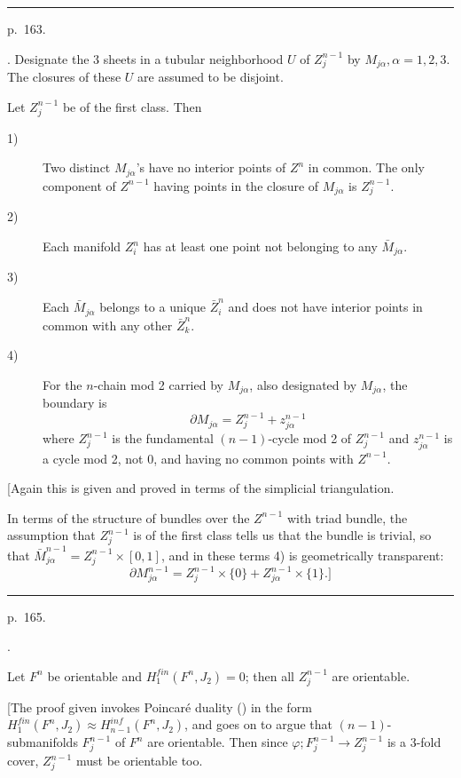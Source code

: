 \documentclass{amsart}
\theoremstyle{plain}
\theoremstyle{definition}
\begin{document}
\medskip
\hrule\smallskip
\noindent p.~163.
\medskip

. Designate the 3 sheets in a tubular neighborhood $U$ of
$Z^{n-1}_j$ by $M_{j\alpha}, \alpha = 1,2,3$. The closures of
these $U$ are assumed to be disjoint.
\begin{lem}\label{Lemma 14} Let $Z^{n-1}_j$ be of the first class.
Then
\begin{description}
\item[1)] Two distinct $M_{j\alpha}$'s have no interior points
of $Z^n$ in common. The only component of $Z^{n-1}$ having
points in the closure of $M_{j\alpha}$ is $Z^{n-1}_j$.
\item[2)] Each manifold $Z^n_i$ has at least one point not
belonging to any ${\bar M}_{j\alpha}$.
\item[3)] Each ${\bar M }_{j\alpha}$ belongs to a unique
${\bar Z}^n_i$ and does not have interior points in common
with any other ${\bar Z}^n_k$.
\item[4)] For the $n$-chain mod 2 carried by $M_{j\alpha}$,
also designated by $M_{j\alpha}$, the boundary is
\begin{equation}\label{eq:lem14}\partial M_{j\alpha} = Z^{n-1}_j + z^{n-1}_{j\alpha}
\end{equation}
where $Z^{n-1}_j$ is the fundamental $(n-1)$-cycle mod 2 of
$Z^{n-1}_j$ and $z^{n-1}_{j\alpha}$ is a cycle mod 2, not 0,
and having no common points with $Z^{n-1}$.
\end{description}
\end{lem}
[Again this is given and proved in terms of the simplicial
triangulation.

In terms of the structure of bundles over the $Z^{n-1}$ with
triad bundle, the assumption that $Z^{n-1}_j$ is of the first
class tells us that the bundle is trivial, so that
${\bar M}^{n-1}_{j\alpha} = Z^{n-1}_j \times [0,1]$, and in
these terms 4) is geometrically transparent:
$$\partial M^{n-1}_{j\alpha} = Z^{n-1}_j \times \{0\} +
Z^{n-1}_{j\alpha} \times \{1\}.]$$

\medskip
\hrule\smallskip
\noindent p.~165.
\medskip

.
\begin{lem}\label{Lemma 15} Let $F^n$ be orientable and
$H^{fin}_1(F^n,J_2) = 0$; then all $Z^{n-1}_j$ are orientable.
\end{lem}
[The proof given invokes Poincar\'e duality (\cite[\S 33]{E})
in the form $H^{fin}_1(F^n,J_2) \approx H^{inf}_{n-1}(F^n,J_2)$,
and goes on to argue that $(n-1)$-submanifolds $F^{n-1}_j$ of
$F^n$ are orientable. Then since $\varphi ; F^{n-1}_j
\to Z^{n-1}_j$ is a 3-fold cover, $Z^{n-1}_j$ must be orientable
too.
\end{document}
